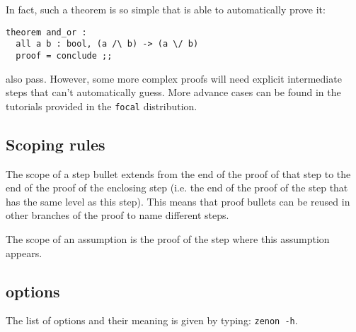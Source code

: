 In fact, such a theorem is so simple that {\zenon} is able to
automatically prove it:

{\scriptsize
\begin{lstlisting}
theorem and_or :
  all a b : bool, (a /\ b) -> (a \/ b)
  proof = conclude ;;
\end{lstlisting}}

\noindent also pass. However, some more complex proofs will need
explicit intermediate steps that {\zenon} can't automatically
guess. More advance cases can be found in the tutorials provided in
the {\tt focal} distribution.

\subsection{Scoping rules}\label{sec:scoping}

The scope of a step bullet extends from the end of the proof of that
step to the end of the proof of the enclosing step (i.e. the end of
the proof of the  step that has the same level as this
step). This means that proof bullets can be reused in other branches
of the proof to name different steps.

The scope of an assumption is the proof of the step where this
assumption appears.

\subsection{{\zenon} options}
\label{zenon-options}
The list of {\zenon} options and their meaning is given by typing:
{\tt zenon -h}.
